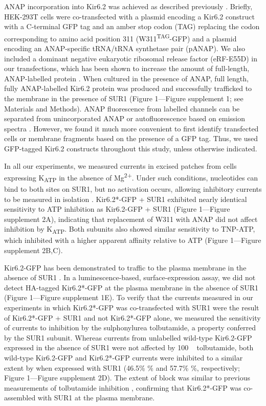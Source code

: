 \documentclass[10pt,lineno, doublespacing]{elife_modified}
\begin{document}
ANAP incorporation into Kir6.2 was achieved as described previously \citep{RN17, RN22, RN80}.
Briefly, HEK-293T cells were co-transfected with a plasmid encoding a Kir6.2 construct with a C-terminal GFP tag and an amber stop codon (TAG) replacing the codon corresponding to amino acid position 311 (W311\textsuperscript{TAG}-GFP) and a plasmid encoding an ANAP-specific tRNA/tRNA synthetase pair (pANAP).
We also included a dominant negative eukaryotic ribosomal release factor (eRF-E55D) in our transfections, which has been shown to increase the amount of full-length, ANAP-labelled protein \citep{RN42, RN80}.
When cultured in the presence of ANAP, full length, fully ANAP-labelled Kir6.2 protein was produced and successfully trafficked to the membrane in the presence of SUR1 (Figure 1—Figure supplement 1; see Materials and Methods).
ANAP fluorescence from labelled channels can be separated from unincorporated ANAP or autofluorescence based on emission spectra \citep{RN80}.
However, we found it much more convenient to first identify transfected cells or membrane fragments based on the presence of a GFP tag.
Thus, we used GFP-tagged Kir6.2 constructs throughout this study, unless otherwise indicated.

In all our experiments, we measured currents in excised patches from cells expressing K\textsubscript{ATP} in the absence of Mg\textsuperscript{2+}.
Under such conditions, nucleotides can bind to both sites on SUR1, but no activation occurs, allowing inhibitory currents to be measured in isolation \citep{RN82, RN60, RN80}.
Kir6.2*-GFP + SUR1 exhibited nearly identical sensitivity to ATP inhibition as Kir6.2-GFP + SUR1 (Figure 1—Figure supplement 2A), indicating that replacement of W311 with ANAP did not affect inhibition by K\textsubscript{ATP}.
Both subunits also showed similar sensitivity to TNP-ATP, which inhibited with a higher apparent affinity relative to ATP (Figure 1—Figure supplement 2B,C).

Kir6.2-GFP has been demonstrated to traffic to the plasma membrane in the absence of SUR1 \citep{RN86, RN48}.
In a luminescence-based, surface-expression assay, we did not detect HA-tagged Kir6.2*-GFP at the plasma membrane in the absence of SUR1 (Figure 1—Figure supplement 1E).
To verify that the currents measured in our experiments in which Kir6.2*-GFP was co-transfected with SUR1 were the result of Kir6.2*-GFP + SUR1 and not Kir6.2*-GFP alone, we measured the sensitivity of currents to inhibition by the sulphonylurea tolbutamide, a property conferred by the SUR1 subunit.
Whereas currents from unlabelled wild-type Kir6.2-GFP expressed in the absence of SUR1 were not affected by 100 \si{\micro\Molar} tolbutamide, both wild-type Kir6.2-GFP and Kir6.2*-GFP currents were inhibited to a similar extent by when expressed with SUR1 (46.5\% \% and 57.7\% \%, respectively; Figure 1—Figure supplement 2D).
The extent of block was similar to previous measurements of tolbutamide inhibition \citep{RN10}, confirming that Kir6.2*-GFP was co-assembled with SUR1 at the plasma membrane.
\end{document}
